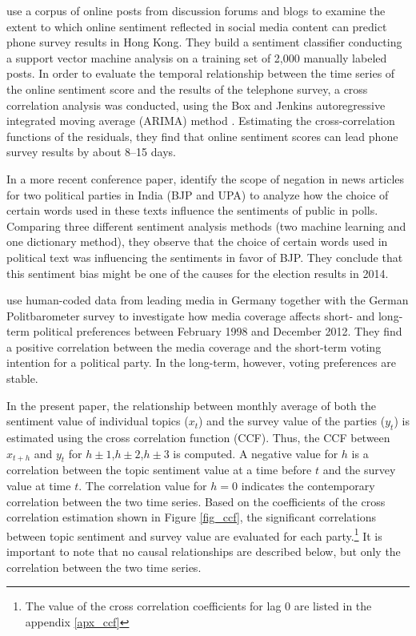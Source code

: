 \documentclass[12pt,a4paper,notitlepage]{article}
\begin{document}
\citet{fu_analyzing_2013} use a corpus of online posts from discussion forums and blogs to examine the extent to which online sentiment reflected in social media content can predict phone survey results in Hong Kong. They build a sentiment classifier conducting a support vector machine analysis on a training set of 2,000 manually labeled posts. In order to evaluate the temporal relationship between the time series of the online sentiment score and the results of the telephone survey, a cross correlation analysis was conducted, using the Box and Jenkins autoregressive integrated moving average (ARIMA) method \citep{box_time_2008}. Estimating the cross-correlation functions of the residuals, they find that online sentiment scores can lead phone survey results by about 8–15 days. 

In a more recent conference paper, \citet{padmaja_evaluating_2014} identify the scope of negation in news articles for two political parties in India (BJP and UPA) to analyze how the choice of certain words used in these texts influence the sentiments of public in polls. Comparing three different sentiment analysis methods (two machine learning and one dictionary method), they observe that the choice of certain words used in political text was influencing the sentiments in favor of BJP. They conclude that this sentiment bias might be one of the causes for the election results in 2014.

\citet{dewenter_can_2018} use human-coded data from leading media in Germany together with the German Politbarometer survey to investigate how media coverage affects short- and long-term political preferences between February 1998 and December 2012. They find a positive correlation between the media coverage and the short-term voting intention for a political party. In the long-term, however, voting preferences are stable. 

In the present paper, the relationship between monthly average of both the sentiment value of individual topics ($x_t$) and the survey value of the parties ($y_t$) is estimated using the cross correlation function (CCF). Thus, the CCF between $x_{t+h}$ and $y_t$ for $h\pm 1$,$h \pm 2$,$h \pm 3$ is computed. A negative value for $h$ is a correlation between the topic sentiment value at a time before $t$ and the survey value at time $t$. The correlation value for $h=0$ indicates the contemporary correlation between the two time series.  Based on the coefficients of the cross correlation estimation shown in Figure \ref{fig_ccf}, the significant correlations between topic sentiment and survey value are evaluated for each party.\footnote{The value of the cross correlation coefficients for lag 0 are listed in the appendix \ref{apx_ccf}} It is important to note that no causal relationships are described below, but only the correlation between the two time series. 
\end{document}
